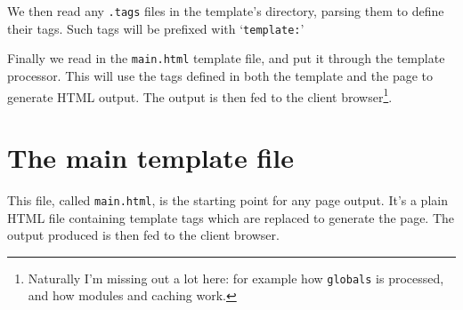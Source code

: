 We then read any \texttt{.tags} files in the template's directory, parsing them to define their tags. Such
tags will be prefixed with `\texttt{template:}'

Finally we read in the \texttt{main.html} template file, and put it through the
template processor. This will use the tags defined in both the template and the page to generate HTML
output. The output is then fed to the client browser\footnote{Naturally I'm
missing out a lot here: for example how \texttt{globals} is processed, and how modules and caching work.}.

\section{The main template file}
This file, called \texttt{main.html}, is the starting point for any page
output. It's a plain HTML file containing template tags which are replaced to
generate the page. The output produced is then fed to the client browser.

